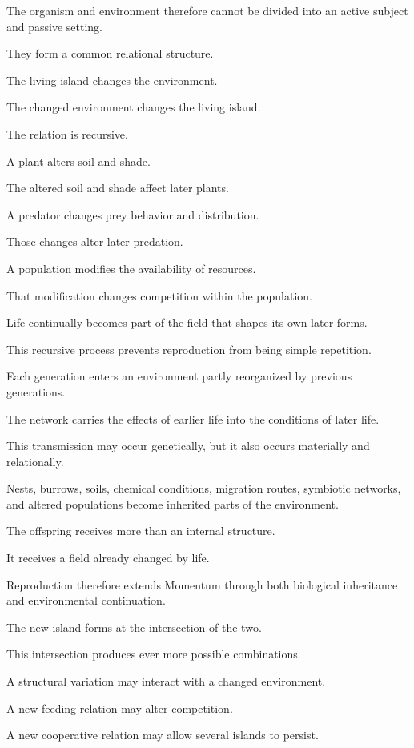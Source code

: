 The organism and environment therefore cannot be divided into an active subject and passive setting.

They form a common relational structure.

The living island changes the environment.

The changed environment changes the living island.

The relation is recursive.

A plant alters soil and shade.

The altered soil and shade affect later plants.

A predator changes prey behavior and distribution.

Those changes alter later predation.

A population modifies the availability of resources.

That modification changes competition within the population.

Life continually becomes part of the field that shapes its own later forms.

This recursive process prevents reproduction from being simple repetition.

Each generation enters an environment partly reorganized by previous generations.

The network carries the effects of earlier life into the conditions of later life.

This transmission may occur genetically, but it also occurs materially and relationally.

Nests, burrows, soils, chemical conditions, migration routes, symbiotic networks, and altered populations become inherited parts of the environment.

The offspring receives more than an internal structure.

It receives a field already changed by life.

Reproduction therefore extends Momentum through both biological inheritance and environmental continuation.

The new island forms at the intersection of the two.

This intersection produces ever more possible combinations.

A structural variation may interact with a changed environment.

A new feeding relation may alter competition.

A new cooperative relation may allow several islands to persist.

